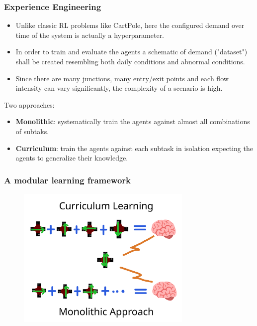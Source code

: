 \documentclass[dvipsnames]{beamer}
\begin{document}
\begin{frame}
\frametitle{Experience Engineering}
  \begin{itemize}
    \item Unlike classic RL problems like CartPole, here the configured demand over time of the system is actually a hyperparameter.
    \item In order to train and evaluate the agents a schematic of demand ("dataset") shall be created resembling both daily conditions and abnormal conditions.
    \item Since there are many junctions, many entry/exit points and each flow intensity can vary significantly, the complexity of a scenario is high.
  \end{itemize}
  
  Two approaches:
  \begin{itemize}
    \item \textbf{Monolithic}: systematically train the agents against almost all combinations of subtaks.
    \item \textbf{Curriculum}: train the agents against each subtask in isolation expecting the agents to generalize their knowledge.
  \end{itemize}
  
\end{frame}

\begin{frame}
\frametitle{A modular learning framework}
  \begin{figure}
    \centering
    \includegraphics[width=0.75\textwidth]{figures/curriculum-vs-monolithic.png}
  \end{figure}
\end{frame}
\end{document}

